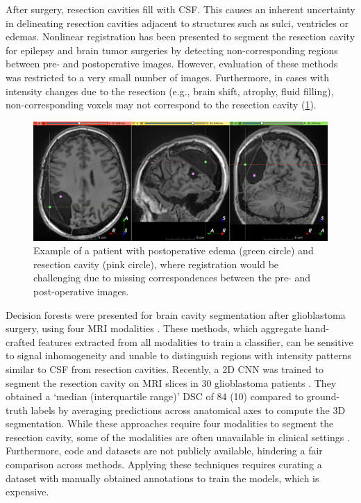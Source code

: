 After surgery, resection cavities fill with \ac{CSF}.
This causes an inherent uncertainty in delineating resection cavities adjacent to structures such as sulci, ventricles or edemas.
Nonlinear registration has been presented to segment the resection cavity for epilepsy \cite{chitphakdithai_non-rigid_2010} and brain tumor \cite{chen_deformable_2015} surgeries by detecting non-corresponding regions between pre- and postoperative images.
However, evaluation of these methods was restricted to a very small number of images.
Furthermore, in cases with intensity changes due to the resection (e.g., brain shift, atrophy, fluid filling), non-corresponding voxels may not correspond to the resection cavity (\cref{fig:missing_correspondences}).

\begin{figure}
  \centering
  \includegraphics[width=\linewidth]{figures/edema_0985}
  \caption[Example of a patient with postoperative edema]{Example of a patient with postoperative edema (green circle) and resection cavity (pink circle), where registration would be challenging due to missing correspondences between the pre- and post-operative images.}
  \label{fig:missing_correspondences}
\end{figure}

Decision forests were presented for brain cavity segmentation after glioblastoma surgery, using four \ac{MRI} modalities \cite{meier_automatic_2017}.
These methods, which aggregate hand-crafted features extracted from all  modalities to train a classifier, can be sensitive to signal inhomogeneity and unable to distinguish regions with intensity patterns similar to \ac{CSF} from resection cavities.
Recently, a 2D \ac{CNN} was trained to segment the resection cavity on \ac{MRI} slices in 30 glioblastoma patients \cite{ermis_fully_2020}.
They obtained a `median (interquartile range)' \ac{DSC} of 84 (10) compared to ground-truth labels by averaging predictions across anatomical axes to compute the 3D segmentation.
While these approaches require four modalities to segment the resection cavity, some of the modalities are often unavailable in clinical settings \cite{dorent_learning_2021}.
Furthermore, code and datasets are not publicly available, hindering a fair comparison across methods.
Applying these techniques requires curating a dataset with manually obtained annotations to train the models, which is expensive.

